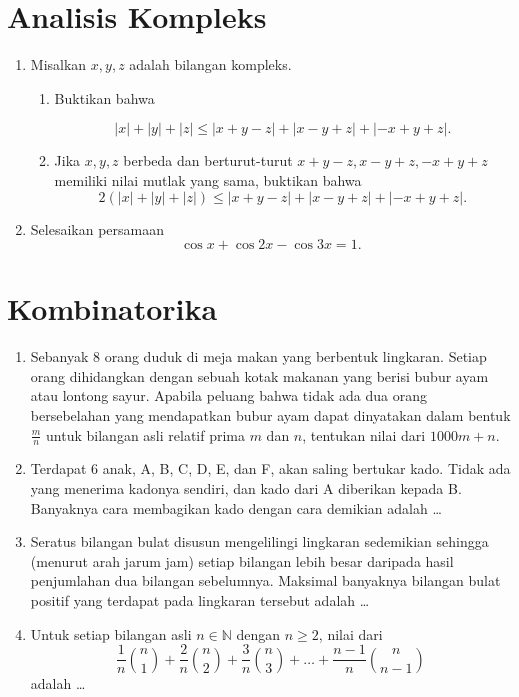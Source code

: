 \documentclass[11pt,a4paper]{article}
\begin{document}
\section*{Analisis Kompleks}
\begin{enumerate}[label=\arabic*.]
  \item %
        Misalkan $x, y, z$ adalah bilangan kompleks.
        \begin{enumerate}[label=(\alph*)]
          \item Buktikan bahwa

                \[
                  |x| + |y| + |z| \le |x+y-z| + |x-y+z| + |-x+y+z|.
                \]
          \item Jika $x, y, z$ berbeda dan berturut-turut $x+y-z, x-y+z, -x+y+z$ memiliki nilai mutlak yang sama, buktikan bahwa
                \[
                  2(|x| + |y| + |z|) \le |x+y-z| + |x-y+z| + |-x+y+z|.
                \]
        \end{enumerate}

  \item %
        Selesaikan persamaan
        \[
          \cos x + \cos 2x - \cos 3x = 1.
        \]
\end{enumerate}

\section*{Kombinatorika}
\begin{enumerate}[label=\arabic*.]
  \item %
        Sebanyak 8 orang duduk di meja makan yang berbentuk lingkaran. Setiap orang dihidangkan dengan sebuah kotak makanan yang berisi bubur ayam atau lontong sayur. Apabila peluang bahwa tidak ada dua orang bersebelahan yang mendapatkan bubur ayam dapat dinyatakan dalam bentuk $\frac{m}{n}$ untuk bilangan asli relatif prima $m$ dan $n$, tentukan nilai dari $1000m + n$.

  \item %
        Terdapat 6 anak, A, B, C, D, E, dan F, akan saling bertukar kado. Tidak ada yang menerima kadonya sendiri, dan kado dari A diberikan kepada B. Banyaknya cara membagikan kado dengan cara demikian adalah \dots

  \item %
        Seratus bilangan bulat disusun mengelilingi lingkaran sedemikian sehingga (menurut arah jarum jam) setiap bilangan lebih besar daripada hasil penjumlahan dua bilangan sebelumnya. Maksimal banyaknya bilangan bulat positif yang terdapat pada lingkaran tersebut adalah \dots

  \item %
        Untuk setiap bilangan asli $n \in \mathbb{N}$ dengan $n \ge 2$, nilai dari
        \[
          \frac{1}{n} \binom{n}{1} + \frac{2}{n} \binom{n}{2} + \frac{3}{n} \binom{n}{3} + \dots + \frac{n-1}{n} \binom{n}{n-1}
        \]
        adalah \dots
\end{enumerate}
\end{document}
